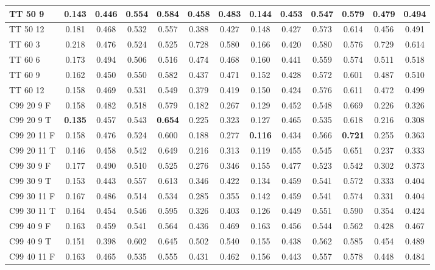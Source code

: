 \documentclass{article}
\begin{document}
\begin{tabular}{|l|c|c|c|c|c|c||c|c|c|c|c|c|}
TT 50  9 & 0.143 & 0.446 & 0.554 & 0.584 & 0.458 & 0.483 & 0.144 & 0.453 & 0.547 & 0.579 & 0.479 & 0.494\\ \hline
TT 50 12 & 0.181 & 0.468 & 0.532 & 0.557 & 0.388 & 0.427 & 0.148 & 0.427 & 0.573 & 0.614 & 0.456 & 0.491\\ \hline
TT 60  3 & 0.218 & 0.476 & 0.524 & 0.525 & 0.728 & 0.580 & 0.166 & 0.420 & 0.580 & 0.576 & 0.729 & 0.614\\ \hline
TT 60  6 & 0.173 & 0.494 & 0.506 & 0.516 & 0.474 & 0.468 & 0.160 & 0.441 & 0.559 & 0.574 & 0.511 & 0.518\\ \hline
TT 60  9 & 0.162 & 0.450 & 0.550 & 0.582 & 0.437 & 0.471 & 0.152 & 0.428 & 0.572 & 0.601 & 0.487 & 0.510\\ \hline
TT 60 12 & 0.158 & 0.469 & 0.531 & 0.549 & 0.379 & 0.419 & 0.150 & 0.424 & 0.576 & 0.611 & 0.472 & 0.499\\ \hline \hline
C99 20  9 F & 0.158 & 0.482 & 0.518 & 0.579 & 0.182 & 0.267 & 0.129 & 0.452 & 0.548 & 0.669 & 0.226 & 0.326\\ \hline
C99 20  9 T & \textbf{0.135} & 0.457 & 0.543 & \textbf{0.654} & 0.225 & 0.323 & 0.127 & 0.465 & 0.535 & 0.618 & 0.216 & 0.308\\ \hline
C99 20 11 F & 0.158 & 0.476 & 0.524 & 0.600 & 0.188 & 0.277 & \textbf{0.116} & 0.434 & 0.566 & \textbf{0.721} & 0.255 & 0.363\\ \hline
C99 20 11 T & 0.146 & 0.458 & 0.542 & 0.649 & 0.216 & 0.313 & 0.119 & 0.455 & 0.545 & 0.651 & 0.237 & 0.333\\ \hline
C99 30  9 F & 0.177 & 0.490 & 0.510 & 0.525 & 0.276 & 0.346 & 0.155 & 0.477 & 0.523 & 0.542 & 0.302 & 0.373\\ \hline
C99 30  9 T & 0.153 & 0.443 & 0.557 & 0.613 & 0.346 & 0.422 & 0.134 & 0.459 & 0.541 & 0.572 & 0.333 & 0.404\\ \hline
C99 30 11 F & 0.167 & 0.486 & 0.514 & 0.534 & 0.285 & 0.355 & 0.142 & 0.459 & 0.541 & 0.574 & 0.331 & 0.404\\ \hline
C99 30 11 T & 0.164 & 0.454 & 0.546 & 0.595 & 0.326 & 0.403 & 0.126 & 0.449 & 0.551 & 0.590 & 0.354 & 0.424\\ \hline
C99 40  9 F & 0.163 & 0.459 & 0.541 & 0.564 & 0.436 & 0.469 & 0.163 & 0.456 & 0.544 & 0.562 & 0.428 & 0.467\\ \hline
C99 40  9 T & 0.151 & 0.398 & 0.602 & 0.645 & 0.502 & 0.540 & 0.155 & 0.438 & 0.562 & 0.585 & 0.454 & 0.489\\ \hline
C99 40 11 F & 0.163 & 0.465 & 0.535 & 0.555 & 0.431 & 0.462 & 0.156 & 0.443 & 0.557 & 0.578 & 0.448 & 0.484\\ \hline

\end{tabular}
\end{document}
